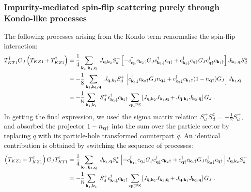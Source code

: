 \documentclass[reprint,hidelinks,onecolumn]{revtex4-2}
\begin{document}
\subsubsection*{Impurity-mediated spin-flip scattering purely through Kondo-like processes}
The following processes arising from the Kondo term renormalise the spin-flip interaction:
\begin{equation}\begin{aligned}\label{kondoRenorm1}
	T^\dagger_{KT1} G_J \left(T_{KZ1} + T_{KZ1}^\dagger\right) &= \frac{1}{4}\sum_{{\bf k}_1, {\bf k}_1, {\bf q}}~J_{{\bf q}, {\bf k}_2} S_d^+ \left[-c^\dagger_{{\bf q}\downarrow} c_{{\bf k}_2 \uparrow} G_J c^\dagger_{{\bf k}_1 \downarrow} c_{{\bf q} \downarrow} + c^\dagger_{{\bf k}_2\downarrow} c_{{\bf q} \uparrow} G_J c^\dagger_{{\bf q}\uparrow} c_{{\bf k}_1 \uparrow}\right]J_{{\bf k}_1,{\bf q}} S_d^z\\
								&= -\frac{1}{8}\sum_{{\bf k}_1, {\bf k}_1, {\bf q}}~J_{{\bf q}, {\bf k}_2} S_d^+ \left[ c^\dagger_{{\bf k}_1 \downarrow}c_{{\bf k}_2 \uparrow} G_J n_{{\bf q} \downarrow} + c^\dagger_{{\bf k}_2\downarrow} c_{{\bf k}_1 \uparrow}(1 - n_{{\bf q} \uparrow}) G_J \right]J_{{\bf k}_1,{\bf q}}\\
								&= -\frac{1}{8}\sum_{{\bf k}_1, {\bf k}_1}~ S_d^+ c^\dagger_{{\bf k}_1 \downarrow}c_{{\bf k}_2 \uparrow}\sum_{{\bf q} \in \text{PS}}\left[J_{{\bf q}, {\bf k}_2} J_{{\bf k}_1,{\bf q}} + J_{{\bf \bar q}, {\bf k}_1} J_{{\bf k}_2,{\bf \bar q}} \right]G_J~.
\end{aligned}\end{equation}
In getting the final expression, we used the sigma matrix relation \(S_d^+ S_d^z = -\frac{1}{2}S_d^+\), and absorbed the projector \(1 - n_{{\bf q} \uparrow}\) into the sum over the particle sector by replacing \(q\) with its particle-hole transformed counterpart \(\bar q\). An identical contribution is obtained by switching the sequence of processes:
\begin{equation}\begin{aligned}\label{kondoRenorm2}
	 \left(T_{KZ1} + T_{KZ1}^\dagger\right) G_J T^\dagger_{KT1} &= \frac{1}{4}\sum_{{\bf k}_1, {\bf k}_1, {\bf q}}~J_{{\bf k}_1,{\bf q}} S_d^z\left[- c^\dagger_{{\bf k}_1 \downarrow} c_{{\bf q} \downarrow}G_J c^\dagger_{{\bf q}\downarrow} c_{{\bf k}_2 \uparrow} +c^\dagger_{{\bf q}\uparrow} c_{{\bf k}_1 \uparrow} G_J c^\dagger_{{\bf k}_2\downarrow} c_{{\bf q} \uparrow} \right] J_{{\bf q}, {\bf k}_2} S_d^+ \\
								&= -\frac{1}{8}\sum_{{\bf k}_1, {\bf k}_1}~ S_d^+ c^\dagger_{{\bf k}_1 \downarrow}c_{{\bf k}_2 \uparrow}\sum_{{\bf q} \in \text{PS}}\left[J_{{\bf \bar q}, {\bf k}_2} J_{{\bf k}_1,{\bf \bar q}} + J_{{\bf q}, {\bf k}_1} J_{{\bf k}_2,{\bf q}} \right]G_J~.
\end{aligned}\end{equation}
\end{document}
